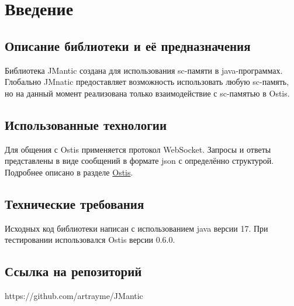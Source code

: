 \section{Введение}
\subsection{Описание библиотеки и её предназначения}
Библиотека JMantic создана для использования sc-памяти в java-программах. Глобально JMnatic предоставляет возможность использовать любую sc-память, но на данный момент реализована только взаимодействие с sc-памятью в Ostis.  
\subsection{Использованные технологии}
Для общения с Ostis применяется протокол WebSocket. Запросы и ответы представлены в виде сообщений в формате json с определённо структурой. Подробнее описано в разделе \hyperref[sec:ostis]{Ostis}.
\subsection{Технические требования}
Исходных код библиотеки написан с использованием java версии 17. При тестировании использовался Ostis версии 0.6.0.  
\subsection{Ссылка на репозиторий}
https://github.com/artrayme/JMantic